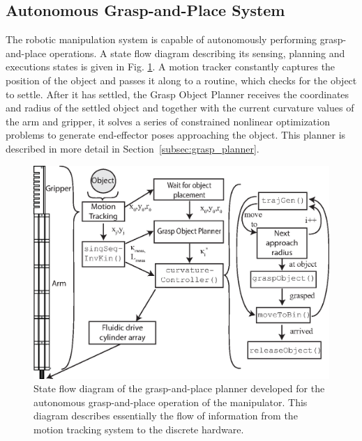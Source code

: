 \subsection{Autonomous Grasp-and-Place System}
\label{subsec:grasp-place-planner}
The robotic manipulation system is capable of autonomously performing grasp-and-place operations. 
A state flow diagram describing its sensing, planning and executions states is given in Fig. \ref{fig:grasp-and-place-planner}. 
A motion tracker constantly captures the position of the object and passes it along to a routine, which checks for the object to settle. 
After it has settled, the Grasp Object Planner receives the coordinates and radius of the settled object and together with the current curvature values of the arm and gripper, it solves a series of constrained nonlinear optimization problems to generate end-effector poses approaching the object.
This planner is described in more detail in Section~\ref{subsec:grasp_planner}.

\begin{figure}[!htb]
\centering
   \includegraphics[width=0.95\columnwidth]{Figures/processing_control/grasp_place_planner.eps}
   \caption{State flow diagram of the grasp-and-place planner developed for the autonomous grasp-and-place operation of the manipulator. This diagram describes essentially the flow of information from the motion tracking system to the discrete hardware.}
   \label{fig:grasp-and-place-planner}
\end{figure}

